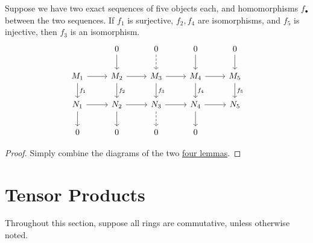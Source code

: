 \begin{corollary}\label{cor:five}\label{lem:five}
    Suppose we have two exact sequences of five objects each,
    and homomorphisms \(f_\bullet\) between the two sequences.
    If \(f_1\) is surjective, \(f_2,f_4\) are isomorphisms, and \(f_5\) is injective,
    then \(f_3\) is an isomorphism.
    \begin{equation*}
        \begin{tikzcd}
            & 0 \arrow{d} & 0 \arrow[dashrightarrow]{d} & 0 \arrow{d} & 0 \arrow{d} \\
            M_1 \arrow{r} \arrow{d}{f_1} & M_2 \arrow{r} \arrow{d}{f_2} &
            M_3 \arrow{r} \arrow{d}{f_3} & M_4 \arrow{r} \arrow{d}{f_4} & M_5 \arrow{d}{f_5} \\
            N_1 \arrow{r} \arrow{d} & N_2 \arrow{r} \arrow{d} &
            N_3 \arrow{r} \arrow[dashrightarrow]{d} & N_4 \arrow{r} \arrow{d} & N_5 \\
            0 & 0 & 0 & 0
        \end{tikzcd}
    \end{equation*}
\end{corollary}
\begin{proof}
    Simply combine the diagrams of the two \hyperref[lem:four]{four lemmas}.
\end{proof}


\section{Tensor Products}

\begin{remark}
    Throughout this section, suppose all rings are commutative,
    unless otherwise noted.
\end{remark}

